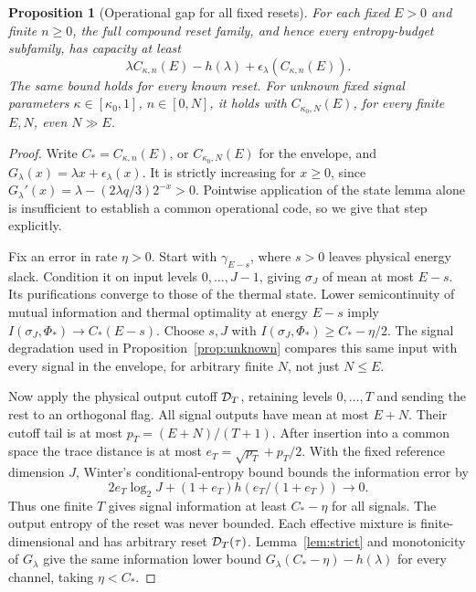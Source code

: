 \documentclass[11pt]{article}
\newtheorem{proposition}[theorem]{Proposition}
\begin{document}
\begin{proposition}[Operational gap for all fixed resets]\label{prop:gap}
For each fixed \(E>0\) and finite \(n\ge0\), the full compound reset
family, and hence every entropy-budget subfamily, has capacity at least
\[
 \lambda C_{\kappa,n}(E)-h(\lambda)
          +\epsilon_\lambda(C_{\kappa,n}(E)).        \tag{20}
\]
The same bound holds for every known reset.
For unknown fixed signal parameters
\(\kappa\in[\kappa_0,1]\), \(n\in[0,N]\), it holds with
\(C_{\kappa_0,N}(E)\), for every finite \(E,N\), even \(N\gg E\).
\end{proposition}
\begin{proof}
Write \(C_*=C_{\kappa,n}(E)\), or \(C_{\kappa_0,N}(E)\) for the
envelope, and \(G_\lambda(x)=\lambda x+\epsilon_\lambda(x)\).
It is strictly increasing for \(x\ge0\), since
\(G_\lambda'(x)=\lambda-(2\lambda q/3)2^{-x}>0\).
Pointwise application of the state lemma alone is insufficient to
establish a common operational code, so we give that step explicitly.

Fix an error in rate \(\eta>0\). Start with
\(\gamma_{E-s}\), where \(s>0\) leaves physical energy slack.
Condition it on input levels \(0,\ldots,J-1\), giving \(\sigma_J\)
of mean at most \(E-s\). Its purifications converge to those of the
thermal state. Lower semicontinuity of mutual information and thermal
optimality at energy \(E-s\) imply
\(I(\sigma_J,\Phi_*)\to C_*(E-s)\).
Choose \(s,J\) with \(I(\sigma_J,\Phi_*)\ge C_*-\eta/2\).
The signal degradation used in Proposition~\ref{prop:unknown}
compares this same input with every signal in the envelope, for
arbitrary finite \(N\), not just \(N\le E\).

Now apply the physical output cutoff \({\cal D}_T\), retaining levels
\(0,\ldots,T\) and sending the rest to an orthogonal flag.
All signal outputs have mean at most \(E+N\).
Their cutoff tail is at most \(p_T=(E+N)/(T+1)\).
After insertion into a common space the trace distance is at most
\(e_T=\sqrt{p_T}+p_T/2\).
With the fixed reference dimension \(J\), Winter's conditional-entropy
bound \cite[Lemma~2]{winter} bounds the information error by
\[
 2e_T\log_2 J+(1+e_T)h(e_T/(1+e_T))\longrightarrow0.
\]
Thus one finite \(T\) gives signal information at least \(C_*-\eta\)
for all signals. The output entropy of the reset was never bounded.
Each effective mixture is finite-dimensional and has arbitrary reset
\({\cal D}_T(\tau)\). Lemma~\ref{lem:strict} and monotonicity of
\(G_\lambda\) give the same information lower bound
\(G_\lambda(C_*-\eta)-h(\lambda)\) for every channel, taking
\(\eta<C_*\).


\end{proof}
\end{document}
